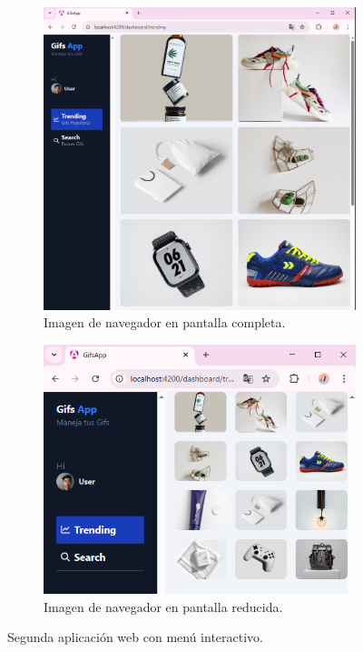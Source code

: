\begin{figure}[H]
\centering
\begin{subfigure}[b]{0.55\textwidth}
\centering
\includegraphics[width=\textwidth]{figuras/foto1.png}
\caption[Navegador web en pantalla completa]{Imagen de navegador en pantalla completa.}
\label{foto1}
\end{subfigure}
\hfill
\begin{subfigure}[b]{0.55\textwidth}
\centering
\includegraphics[width=\textwidth]{figuras/foto2.png}
\caption[Navegador web en pantalla reducida]{Imagen de navegador en pantalla reducida.}
\label{foto2}
\end{subfigure}
\caption{Segunda aplicación web con menú interactivo.}
\label{fotomenu}
\end{figure}

